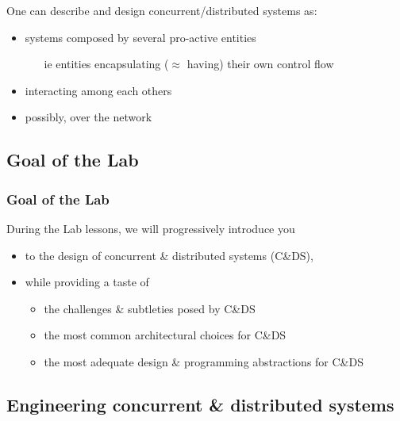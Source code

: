 \documentclass[handout]{beamer}\mode<presentation>{\usetheme{AMSCesenaPurpleAndGold}}
\begin{document}
\begin{frame}[allowframebreaks]
	One can describe and design concurrent/distributed systems as:
	\begin{itemize}
		\item systems composed by several \alert{pro-active} entities
		\begin{itemize}
			\item[ie] entities \alert{encapsulating} ($\approx$ having) their own \alert{control flow}
		\end{itemize}
		\item \alert{interacting} among each others
		\item possibly, over the \alert{network}
	\end{itemize}

\end{frame}

\subsection{Goal of the Lab}

\begin{frame}
	\frametitle{Goal of the Lab}
	
	During the Lab lessons, we will progressively introduce you
	\vfill
	\begin{itemize}
		\item to the \alert{design} of concurrent \& distributed systems (C\&DS),
		
		\vfill
		
		\item while providing a taste of 
		\begin{itemize}
			\item the challenges \& subtleties posed by C\&DS
			\item the most common architectural choices for C\&DS
			\item the most adequate design \& programming abstractions for C\&DS
		\end{itemize}
	
	\end{itemize}
	
\end{frame}

\subsection{Engineering concurrent \& distributed systems}
\end{document}
